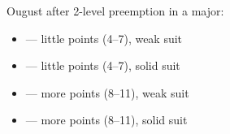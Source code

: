 Ougust  after 2-level preemption in a major:
\begin{itemize}
    \item {} --- little points (4--7), weak suit
    \item {} --- little points (4--7), solid suit
    \item {} --- more points (8--11), weak suit
    \item {} --- more points (8--11), solid suit
\end{itemize}

